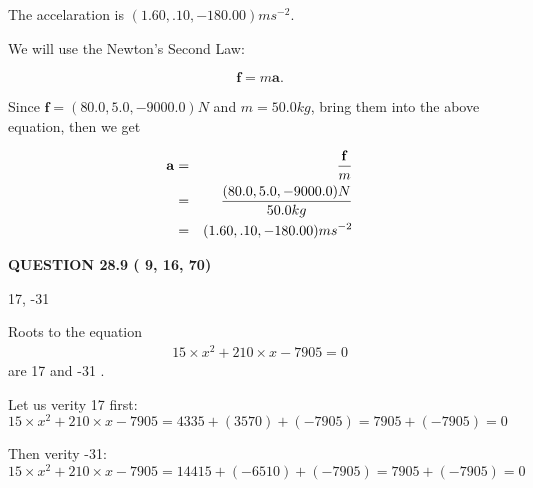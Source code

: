 \documentclass[12pt]{article}
\begin{document}
 
\noindent{}
 
 
  The accelaration is $  %
(
1.60,
.10,
-180.00)
ms^{-2} $.
 
 
 
 
 
 
\noindent{}

We will use the Newton's Second Law:
 
\[
\mathbf{f}=m\mathbf{a}.
\]
 
Since $\mathbf{f}= %
(80.0 , 5.0 , -9000.0) N$
and $m= %
50.0kg$, bring them into the above equation, then we get
 
\begin{eqnarray*}
\mathbf{a}&=&\frac{\mathbf{f}}m  \\
&=&\frac{ %
(80.0 , 5.0 , -9000.0) N}{ %
50.0kg}  \\
&=& %
(1.60 , .10 , -180.00) ms^{-2}
\end{eqnarray*}
 
 
 
  
\vspace{0.2in}
  
{\textbf{\Large{QUESTION
28.9 
 (          9,         16,         70)
}}}
  
  


 
 
\noindent{}

17,  %
-31
 
 
 
 
 
\noindent{}

Roots to the equation
\begin{eqnarray*}
15 \times x^2  %
+  %
210
                 \times x    %
-7905 =0
\end{eqnarray*}
are  %
17 and  %
-31 .
 
Let us verity  %
17 first:
$  %
15 \times x^2  %
+  %
210
                 \times x    %
-7905
  = %
4335+( %
3570)+( %
-7905)
  = %
7905+( %
-7905)
  = %
0
$
 
Then verity  %
-31:
$  %
15 \times x^2  %
+  %
210
                 \times x    %
-7905
  = %
14415+( %
-6510)+( %
-7905)
  = %
7905+( %
-7905)
  = %
0
$
 
\end{document}
